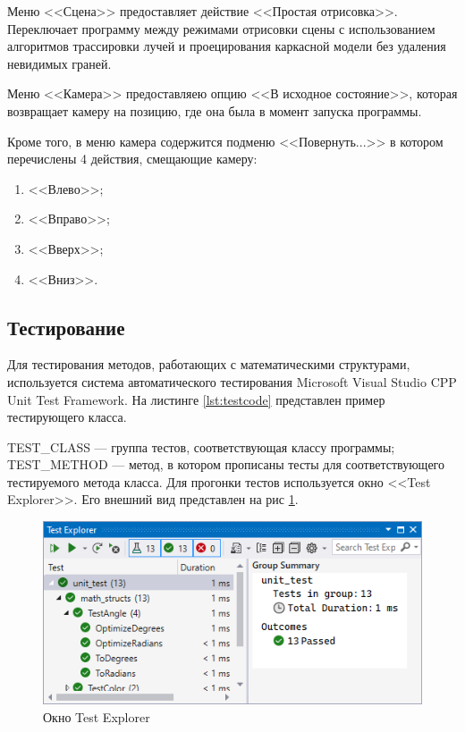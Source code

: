 Меню <<Сцена>> предоставляет действие <<Простая отрисовка>>. Переключает программу между режимами отрисовки сцены с использованием алгоритмов трассировки лучей и проецирования каркасной модели без удаления невидимых граней.

Меню <<Камера>> предоставляею опцию <<В исходное состояние>>, которая возвращает камеру на позицию, где она была в момент запуска программы.

Кроме того, в меню камера содержится подменю <<Повернуть...>> в котором перечислены 4 действия, смещающие камеру:
\begin{enumerate}
	\item <<Влево>>;
	\item <<Вправо>>;
	\item <<Вверх>>;
	\item <<Вниз>>.
\end{enumerate}

\subsection{Тестирование}
Для тестирования методов, работающих с математическими структурами, используется система автоматического тестирования Microsoft Visual Studio CPP Unit Test Framework. На листинге \ref{lst:testcode} представлен пример тестирующего класса.

TEST\_CLASS --- группа тестов, соответствующая классу программы; TEST\_METHOD --- метод, в котором прописаны тесты для соответствующего тестируемого метода класса. Для прогонки тестов используется окно <<Test Explorer>>. Его внешний вид представлен на рис \ref{fig:test_explorer}.

\begin{figure}[ht]
	\centering
	\includegraphics[width=1\linewidth]{img/test_explorer}
	\caption{Окно Test Explorer}
	\label{fig:test_explorer}
\end{figure}
\clearpage

